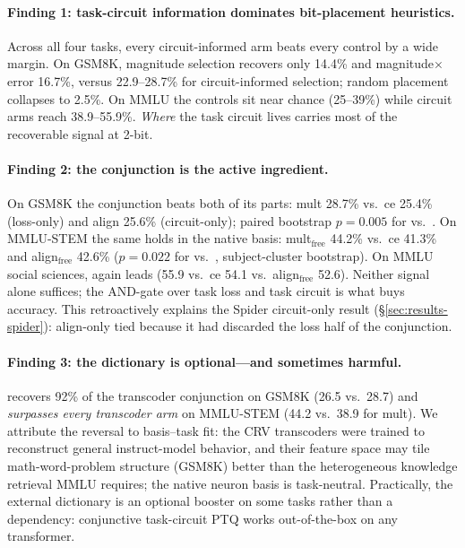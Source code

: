 \paragraph{Finding 1: task-circuit information dominates bit-placement
heuristics.} Across all four tasks, every circuit-informed arm beats every
control by a wide margin. On GSM8K, magnitude selection recovers only 14.4\%
and magnitude$\times$error 16.7\%, versus 22.9--28.7\% for circuit-informed
selection; random placement collapses to 2.5\%. On MMLU the controls sit near
chance (25--39\%) while circuit arms reach 38.9--55.9\%. \emph{Where} the task
circuit lives carries most of the recoverable signal at 2-bit.

\paragraph{Finding 2: the conjunction is the active ingredient.}
On GSM8K the conjunction beats both of its parts: mult 28.7\% vs.\ ce 25.4\%
(loss-only) and align 25.6\% (circuit-only); paired bootstrap $p{=}0.005$ for
\method{} vs.\ \baseline{}. On MMLU-STEM the same holds in the native basis:
mult$_{\text{free}}$ 44.2\% vs.\ ce 41.3\% and align$_{\text{free}}$ 42.6\%
($p{=}0.022$ for \methodfree{} vs.\ \method{}, subject-cluster bootstrap).
On MMLU social sciences, \methodfree{} again leads (55.9 vs.\ ce 54.1 vs.\
align$_{\text{free}}$ 52.6). Neither signal alone suffices; the AND-gate over
task loss and task circuit is what buys accuracy. This retroactively explains
the Spider circuit-only result (\S\ref{sec:results-spider}): align-only tied
\baseline{} because it had discarded the loss half of the conjunction.

\paragraph{Finding 3: the dictionary is optional---and sometimes harmful.}
\methodfree{} recovers 92\% of the transcoder conjunction on GSM8K (26.5 vs.\
28.7) and \emph{surpasses every transcoder arm} on MMLU-STEM (44.2 vs.\ 38.9
for mult). We attribute the reversal to basis--task fit: the CRV transcoders
were trained to reconstruct general instruct-model behavior, and their feature
space may tile math-word-problem structure (GSM8K) better than the
heterogeneous knowledge retrieval MMLU requires; the native neuron basis is
task-neutral. Practically, the external dictionary is an optional booster on
some tasks rather than a dependency: conjunctive task-circuit PTQ works
out-of-the-box on any transformer.

